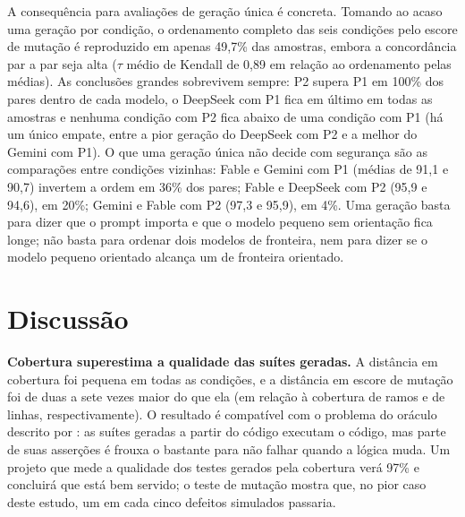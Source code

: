 A consequência para avaliações de geração única é concreta. Tomando ao acaso uma geração por condição, o ordenamento completo das seis condições pelo escore de mutação é reproduzido em apenas 49,7\% das amostras, embora a concordância par a par seja alta ($\tau$ médio de Kendall de 0,89 em relação ao ordenamento pelas médias). As conclusões grandes sobrevivem sempre: P2 supera P1 em 100\% dos pares dentro de cada modelo, o DeepSeek com P1 fica em último em todas as amostras e nenhuma condição com P2 fica abaixo de uma condição com P1 (há um único empate, entre a pior geração do DeepSeek com P2 e a melhor do Gemini com P1). O que uma geração única não decide com segurança são as comparações entre condições vizinhas: Fable e Gemini com P1 (médias de 91,1 e 90,7) invertem a ordem em 36\% dos pares; Fable e DeepSeek com P2 (95,9 e 94,6), em 20\%; Gemini e Fable com P2 (97,3 e 95,9), em 4\%. Uma geração basta para dizer que o prompt importa e que o modelo pequeno sem orientação fica longe; não basta para ordenar dois modelos de fronteira, nem para dizer se o modelo pequeno orientado alcança um de fronteira orientado.

\section{Discussão}
\label{sec:discussao}

\textbf{Cobertura superestima a qualidade das suítes geradas.} A distância em cobertura foi pequena em todas as condições, e a distância em escore de mutação foi de duas a sete vezes maior do que ela (em relação à cobertura de ramos e de linhas, respectivamente). O resultado é compatível com o problema do oráculo descrito por : as suítes geradas a partir do código executam o código, mas parte de suas asserções é frouxa o bastante para não falhar quando a lógica muda. Um projeto que mede a qualidade dos testes gerados pela cobertura verá 97\% e concluirá que está bem servido; o teste de mutação mostra que, no pior caso deste estudo, um em cada cinco defeitos simulados passaria.

